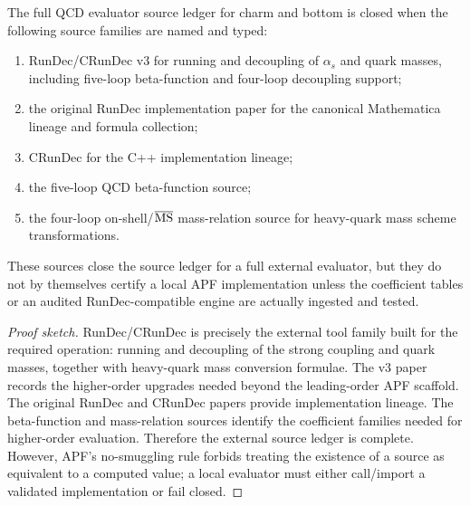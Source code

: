 \begin{theorem}
\label{thm:rundec-source-ledger-closure-v72}
The full QCD evaluator source ledger for charm and bottom is closed when the following source families are named and typed:
\begin{enumerate}
\item RunDec/CRunDec v3 for running and decoupling of $\alpha_s$ and quark masses, including five-loop beta-function and four-loop decoupling support;
\item the original RunDec implementation paper for the canonical Mathematica lineage and formula collection;
\item CRunDec for the C++ implementation lineage;
\item the five-loop QCD beta-function source;
\item the four-loop on-shell/$\overline{\rm MS}$ mass-relation source for heavy-quark mass scheme transformations.
\end{enumerate}
These sources close the source ledger for a full external evaluator, but they do not by themselves certify a local APF implementation unless the coefficient tables or an audited RunDec-compatible engine are actually ingested and tested.
\end{theorem}

\begin{proof}[Proof sketch]
RunDec/CRunDec is precisely the external tool family built for the required operation: running and decoupling of the strong coupling and quark masses, together with heavy-quark mass conversion formulae.  The v3 paper records the higher-order upgrades needed beyond the leading-order APF scaffold.  The original RunDec and CRunDec papers provide implementation lineage.  The beta-function and mass-relation sources identify the coefficient families needed for higher-order evaluation.  Therefore the external source ledger is complete.  However, APF's no-smuggling rule forbids treating the existence of a source as equivalent to a computed value; a local evaluator must either call/import a validated implementation or fail closed.
\end{proof}

